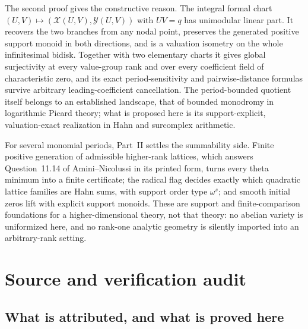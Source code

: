 \documentclass[11pt,letterpaper]{article}
\theoremstyle{definition}
\newcommand{\X}{\mathcal X}
\newcommand{\Y}{\mathcal Y}
\begin{document}
The second proof gives the constructive reason. The integral formal chart
$(U,V)\mapsto(\X(U,V),\Y(U,V))$ with $UV=q$ has unimodular linear part. It
recovers the two branches from any nodal point, preserves the generated
positive support monoid in both directions, and is a valuation isometry on
the whole infinitesimal bidisk. Together with two elementary charts it
gives global surjectivity at every value-group rank and over every
coefficient field of characteristic zero, and its exact period-sensitivity
and pairwise-distance formulas survive arbitrary leading-coefficient
cancellation. The period-bounded quotient itself belongs to an established
landscape, that of bounded monodromy in logarithmic Picard theory; what is
proposed here is its support-explicit, valuation-exact realization in Hahn
and surcomplex arithmetic.

For several monomial periods, Part~II settles the summability side. Finite
positive generation of admissible higher-rank lattices, which answers
Question~11.14 of Amini--Nicolussi in its printed form, turns every theta
minimum into a finite certificate; the radical flag decides exactly which
quadratic lattice families are Hahn sums, with support order type
$\omega^s$; and smooth initial zeros lift with explicit support monoids.
These are support and finite-comparison foundations for a
higher-dimensional theory, not that theory: no abelian variety is
uniformized here, and no rank-one analytic geometry is silently imported
into an arbitrary-rank setting.

\appendix
\section{Source and verification audit}\label{tate:app:audit}

\subsection{What is attributed, and what is proved here}
\end{document}
